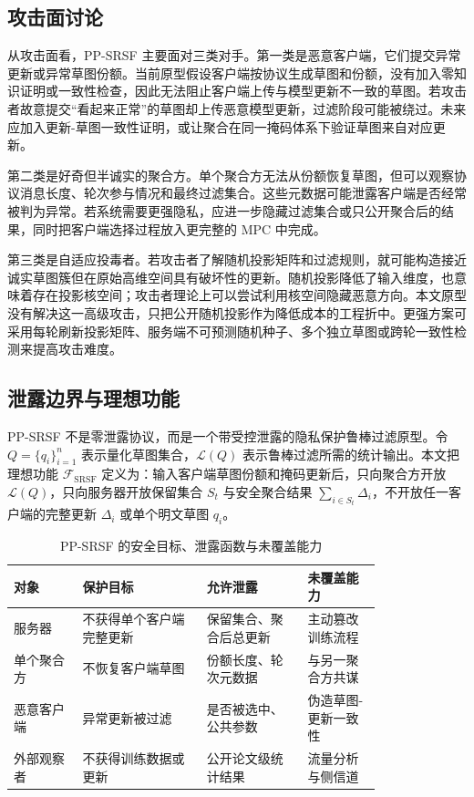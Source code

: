 \documentclass[final]{jcr}
\begin{document}
\subsection{攻击面讨论}
从攻击面看，PP-SRSF 主要面对三类对手。第一类是恶意客户端，它们提交异常更新或异常草图份额。当前原型假设客户端按协议生成草图和份额，没有加入零知识证明或一致性检查，因此无法阻止客户端上传与模型更新不一致的草图。若攻击者故意提交“看起来正常”的草图却上传恶意模型更新，过滤阶段可能被绕过。未来应加入更新-草图一致性证明，或让聚合在同一掩码体系下验证草图来自对应更新。

第二类是好奇但半诚实的聚合方。单个聚合方无法从份额恢复草图，但可以观察协议消息长度、轮次参与情况和最终过滤集合。这些元数据可能泄露客户端是否经常被判为异常。若系统需要更强隐私，应进一步隐藏过滤集合或只公开聚合后的结果，同时把客户端选择过程放入更完整的 MPC 中完成。

第三类是自适应投毒者。若攻击者了解随机投影矩阵和过滤规则，就可能构造接近诚实草图簇但在原始高维空间具有破坏性的更新。随机投影降低了输入维度，也意味着存在投影核空间；攻击者理论上可以尝试利用核空间隐藏恶意方向。本文原型没有解决这一高级攻击，只把公开随机投影作为降低成本的工程折中。更强方案可采用每轮刷新投影矩阵、服务端不可预测随机种子、多个独立草图或跨轮一致性检测来提高攻击难度。

\subsection{泄露边界与理想功能}
PP-SRSF 不是零泄露协议，而是一个带受控泄露的隐私保护鲁棒过滤原型。令 $Q=\{q_i\}_{i=1}^{n}$ 表示量化草图集合，$\mathcal{L}(Q)$ 表示鲁棒过滤所需的统计输出。本文把理想功能 $\mathcal{F}_{\mathrm{SRSF}}$ 定义为：输入客户端草图份额和掩码更新后，只向聚合方开放 $\mathcal{L}(Q)$，只向服务器开放保留集合 $S_t$ 与安全聚合结果 $\sum_{i\in S_t}\Delta_i$，不开放任一客户端的完整更新 $\Delta_i$ 或单个明文草图 $q_i$。

\begin{table}
\centering
{}
\caption{PP-SRSF 的安全目标、泄露函数与未覆盖能力}{}
\label{tab:leakage}
\begingroup
\setlength{\tabcolsep}{3pt}
\begin{tabular}{p{0.15\linewidth}p{0.27\linewidth}p{0.22\linewidth}p{0.16\linewidth}}
\toprule
对象 & 保护目标 & 允许泄露 & 未覆盖能力\\
\midrule
服务器 & 不获得单个客户端完整更新 & 保留集合、聚合后总更新 & 主动篡改训练流程\\
单个聚合方 & 不恢复客户端草图 & 份额长度、轮次元数据 & 与另一聚合方共谋\\
恶意客户端 & 异常更新被过滤 & 是否被选中、公共参数 & 伪造草图-更新一致性\\
外部观察者 & 不获得训练数据或更新 & 公开论文级统计结果 & 流量分析与侧信道\\
\bottomrule
\end{tabular}
\endgroup
\end{table}
\end{document}
